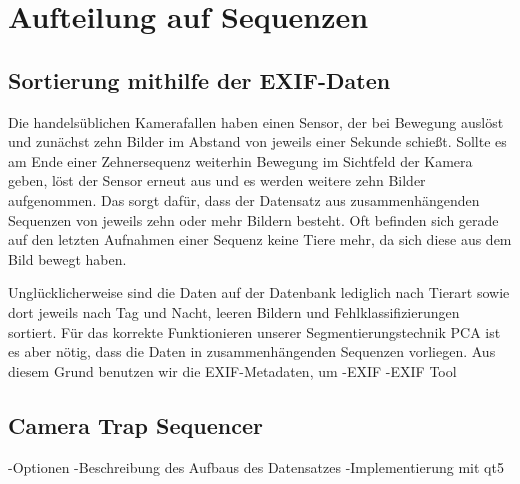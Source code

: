 \section{Aufteilung auf Sequenzen}

\subsection{Sortierung mithilfe der EXIF-Daten}

Die handelsüblichen Kamerafallen haben einen Sensor, der bei Bewegung auslöst und zunächst zehn Bilder im Abstand von jeweils einer Sekunde schießt. Sollte es am Ende einer Zehnersequenz weiterhin Bewegung im Sichtfeld der Kamera geben, löst der Sensor erneut aus und es werden weitere zehn Bilder aufgenommen. Das sorgt dafür, dass der Datensatz aus zusammenhängenden Sequenzen von jeweils zehn oder mehr Bildern besteht. Oft befinden sich gerade auf den letzten Aufnahmen einer Sequenz keine Tiere mehr, da sich diese aus dem Bild bewegt haben. 

Unglücklicherweise sind die Daten auf der Datenbank lediglich nach Tierart sowie dort jeweils nach Tag und Nacht, leeren Bildern und Fehlklassifizierungen sortiert. Für das korrekte Funktionieren unserer Segmentierungstechnik PCA ist es aber nötig, dass die Daten in zusammenhängenden Sequenzen vorliegen. Aus diesem Grund benutzen wir die EXIF-Metadaten, um  
-EXIF
-EXIF Tool

\subsection{Camera Trap Sequencer}
-Optionen
-Beschreibung des Aufbaus des Datensatzes
-Implementierung mit qt5